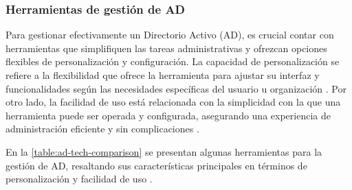 \subsubsection{Herramientas de gestión de AD}

Para gestionar efectivamente un Directorio Activo (AD), es crucial contar con herramientas que simplifiquen las tareas administrativas y ofrezcan opciones flexibles de personalización y configuración. La capacidad de personalización se refiere a la flexibilidad que ofrece la herramienta para ajustar su interfaz y funcionalidades según las necesidades específicas del usuario u organización \autocite{van_der_hoek_configurable_1999}. Por otro lado, la facilidad de uso está relacionada con la simplicidad con la que una herramienta puede ser operada y configurada, asegurando una experiencia de administración eficiente y sin complicaciones \autocite{sheppard_re-examining_2019}.

En la \autoref{table:ad-tech-comparison} se presentan algunas herramientas para la gestión de AD, resaltando sus características principales en términos de personalización y facilidad de uso \autocite{graber_stgrabersamba4-manager_2024,jerez_vicentgjad-webmanager_2024,han_remote_2024,karzynski_webmin_2014}.

